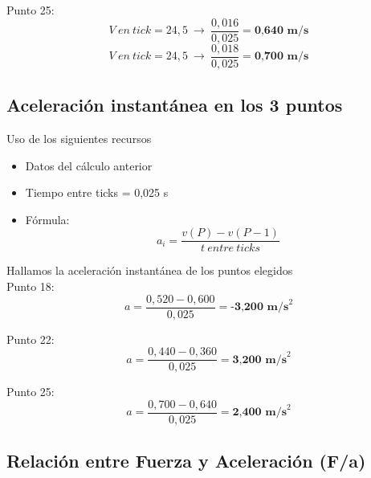 \documentclass[10pt]{article}
\begin{document}
\vspace{0,25cm}
Punto 25:
 \begin{equation*}
    V~en~tick = 24,5 ~ \longrightarrow ~ \frac{0,016}{0,025} = \textbf{0,640~m/s}
\end{equation*}
\vspace{0,1cm}
 \begin{equation*}
    V~en~tick = 24,5 ~ \longrightarrow ~ \frac{0,018}{0,025} = \textbf{0,700~m/s}
\end{equation*}
\vspace{-1mm}

\subsection{Aceleración instantánea en los 3 puntos}\vspace{2mm}

Uso de los siguientes recursos
\begin{itemize}
    \item Datos del cálculo anterior
    \item Tiempo entre ticks = 0,025 s
    \item Fórmula:
    \large{\begin{equation}
        a_{i} = \frac{v(P) - v(P-1)}{t~entre~ticks}
    \end{equation}}
\end{itemize}
\vspace{0,5cm}
Hallamos la aceleración instantánea de los puntos elegidos\\

Punto 18:
 \begin{equation*}
    a = \frac{0,520-0,600}{0,025} = \textbf{-3,200~m/s}^{2}
\end{equation*}
\vspace{0,2cm}

Punto 22:
 \begin{equation*}
    a = \frac{0,440-0,360}{0,025} = \textbf{3,200~m/s}^{2}
\end{equation*}
\vspace{0,2cm}

Punto 25:
 \begin{equation*}
    a = \frac{0,700-0,640}{0,025} = \textbf{2,400~m/s}^{2}
\end{equation*}
\vspace{-1mm}

\subsection{Relación entre Fuerza y Aceleración (F/a)}
\vspace{0,2cm}
\end{document}
